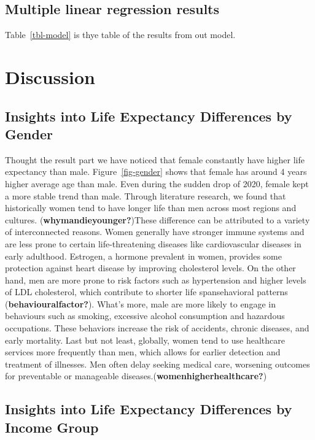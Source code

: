 \documentclass[
  letterpaper,
  DIV=11,
  numbers=noendperiod]{scrartcl}
\begin{document}
\subsection{Multiple linear regression
results}\label{multiple-linear-regression-results}

Table~\ref{tbl-model} is thye table of the results from out model.

\section{Discussion}\label{discussion}

\subsection{Insights into Life Expectancy Differences by
Gender}\label{insights-into-life-expectancy-differences-by-gender}

Thought the result part we have noticed that female constantly have
higher life expectancy than male. Figure~\ref{fig-gender} shows that
female has around 4 years higher average age than male. Even during the
sudden drop of 2020, female kept a more stable trend than male. Through
literature research, we found that historically women tend to have
longer life than men across most regions and cultures.
(\textbf{whymandieyounger?})These difference can be attributed to a
variety of interconnected reasons. Women generally have stronger immune
systems and are less prone to certain life-threatening diseases like
cardiovascular diseases in early adulthood. Estrogen, a hormone
prevalent in women, provides some protection against heart disease by
improving cholesterol levels. On the other hand, men are more prone to
risk factors such as hypertension and higher levels of LDL cholesterol,
which contribute to shorter life spansehavioral patterns
(\textbf{behaviouralfactor?}). What's more, male are more likely to
engage in behaviours such as smoking, excessive alcohol consumption and
hazardous occupations. These behaviors increase the risk of accidents,
chronic diseases, and early mortality. Last but not least, globally,
women tend to use healthcare services more frequently than men, which
allows for earlier detection and treatment of illnesses. Men often delay
seeking medical care, worsening outcomes for preventable or manageable
diseases.(\textbf{womenhigherhealthcare?})

\subsection{Insights into Life Expectancy Differences by Income
Group}\label{insights-into-life-expectancy-differences-by-income-group}
\end{document}
